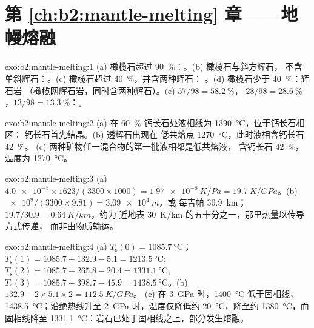 \section*{第 \ref{ch:b2:mantle-melting} 章——地幔熔融}

\begin{solution}{exo:b2:mantle-melting:1}
(a) 橄榄石超过 \qty{90}{\percent}：。(b) 橄榄石与斜方辉石，
不含单斜辉石：。(c) 橄榄石超过 \qty{40}{\percent}，并含两种辉石：
。(d) 橄榄石少于 \qty{40}{\percent}：辉石岩
（橄榄网辉石岩，同时含两种辉石）。(e) $57/98 = \qty{58.2}{\percent}$，
$28/98 = \qty{28.6}{\percent}$，$13/98 = \qty{13.3}{\percent}$：。
\end{solution}

\begin{solution}{exo:b2:mantle-melting:2}
(a) 在 \qty{60}{\percent} 钙长石处液相线为 \qty{1390}{\celsius}，位于钙长石相区：
钙长石首先结晶。(b) 透辉石出现在
低共熔点 \qty{1270}{\celsius}，此时液相含钙长石 \qty{42}{\percent}。
(c) 两种矿物任一混合物的第一批液相都是低共熔液，
含钙长石 \qty{42}{\percent}，温度为 \qty{1270}{\celsius}。
\end{solution}

\begin{solution}{exo:b2:mantle-melting:3}
(a) $\num{4.0e-5}\times1623/(3300\times1000) = \qty{1.97e-8}{K/Pa} =
\qty{19.7}{K/GPa}$。(b) $\num{e9}/(3300\times9.81) = \qty{3.09e4}{m}$，或
每吉帕 \qty{30.9}{km}；$19.7/30.9 = \qty{0.64}{K/km}$，约为
近地表 \qty{30}{K/km} 的五十分之一，那里热量以传导方式传递，
而非由物质输运。
\end{solution}

\begin{solution}{exo:b2:mantle-melting:4}
(a) $T_{\mathrm s}(0) = \qty{1085.7}{\celsius}$；$T_{\mathrm s}(1) = 1085.7 +
132.9 - 5.1 = \qty{1213.5}{\celsius}$; $T_{\mathrm s}(2) = 1085.7 + 265.8 - 20.4 =
\qty{1331.1}{\celsius}$; $T_{\mathrm s}(3) = 1085.7 + 398.7 - 45.9 =
\qty{1438.5}{\celsius}$。(b) $132.9 - 2\times5.1\times2 = \qty{112.5}{K/GPa}$。
(c) 在 \qty{3}{GPa} 时，\qty{1400}{\celsius} 低于固相线，
\qty{1438.5}{\celsius}；沿绝热线升至 \qty{2}{GPa} 时，温度仅降低约
\qty{20}{\celsius}，降至约 \qty{1380}{\celsius}，而固相线降至
\qty{1331.1}{\celsius}：岩石已处于固相线之上，部分发生熔融。
\end{solution}

